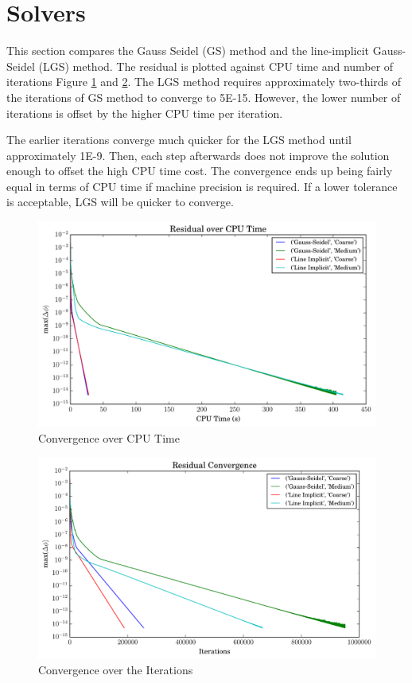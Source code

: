 \documentclass[letterpaper,12pt,]{article}
\begin{document}
\clearpage
\section*{Solvers}

This section compares the Gauss Seidel (GS) method and the line-implicit Gauss-Seidel (LGS) method.
The residual is plotted against CPU time and number of iterations Figure \ref{fig:q4time} and \ref{fig:q4res}.
The LGS method requires approximately two-thirds of the iterations of GS method to converge to 5\textsc{E-}15.
However, the lower number of iterations is offset by the higher CPU time per iteration.

The earlier iterations converge much quicker for the LGS method until approximately 1\textsc{E-}9.
Then, each step afterwards does not improve the solution enough to offset the high CPU time cost.
The convergence ends up being fairly equal in terms of CPU time if machine precision is required.
If a lower tolerance is acceptable, LGS will be quicker to converge.


\begin{figure}[!htbp]
    \centering
    \includegraphics[width=\linewidth]{./Figures/q4time.pdf}
    \caption{Convergence over CPU Time}
    \label{fig:q4time}
\end{figure}

\begin{figure}[!htbp]
    \centering
    \includegraphics[width=\linewidth]{./Figures/q4res.pdf}
    \caption{Convergence over the Iterations}
    \label{fig:q4res}
\end{figure}
\end{document}

